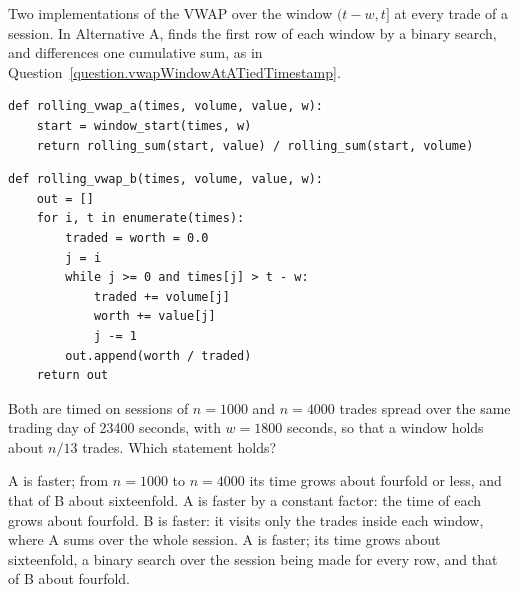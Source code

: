 \begin{question}
\label{question.rollingVwapByCumulativeSums}
Two implementations of the VWAP over the window $(t - w, t]$ at every trade of a session.
In Alternative A,
 finds the first row of each window by a binary search,
and  differences one cumulative sum,
as in Question~\ref{question.vwapWindowAtATiedTimestamp}.
\begin{lstlisting}[caption={Alternative A}, label=listing.rollingVwapA]
def rolling_vwap_a(times, volume, value, w):
    start = window_start(times, w)
    return rolling_sum(start, value) / rolling_sum(start, volume)
\end{lstlisting}
\begin{lstlisting}[caption={Alternative B}, label=listing.rollingVwapB]
def rolling_vwap_b(times, volume, value, w):
    out = []
    for i, t in enumerate(times):
        traded = worth = 0.0
        j = i
        while j >= 0 and times[j] > t - w:
            traded += volume[j]
            worth += value[j]
            j -= 1
        out.append(worth / traded)
    return out
\end{lstlisting}
Both are timed on sessions of $n = 1000$ and $n = 4000$ trades
spread over the same trading day of 23400 seconds,
with $w = 1800$ seconds,
so that a window holds about $n/13$ trades.
Which statement holds?
\begin{choices}
 \correctchoice A is faster;
  from $n = 1000$ to $n = 4000$ its time grows about fourfold or less,
  and that of B about sixteenfold.
 \choice A is faster by a constant factor:
  the time of each grows about fourfold.
 \choice B is faster:
  it visits only the trades inside each window,
  where A sums over the whole session.
 \choice A is faster;
  its time grows about sixteenfold, a binary search over the session being made for every row,
  and that of B about fourfold.
\end{choices}
\end{question}

